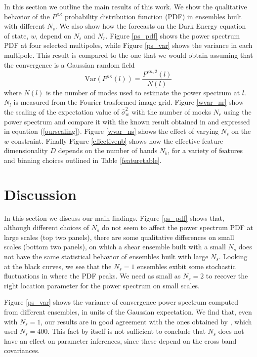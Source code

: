 \documentclass[reprint,aps,prd,superscriptaddress,showkeys,showpacs]{revtex4-1}
\newcommand{\h}[1]{\hat{#1}}
\begin{document}
In this section we outline the main results of this work. We show the qualitative behavior of the $P^{\kappa\kappa}$ probability distribution function (PDF) in ensembles built with different $N_s$. We also show how the forecasts on the Dark Energy equation of state, $w$, depend on $N_s$ and $N_r$. Figure \ref{ps_pdf} shows the power spectrum PDF at four selected multipoles, while Figure \ref{ps_var} shows the variance in each multipole. This result is compared to the one that we would obtain assuming that the convergence is a Gaussian random field
\begin{equation}
\label{gaussianvar}
\mathrm{Var}(P^{\kappa\kappa}(l)) = \frac{P^{\kappa\kappa,2}(l)}{N(l)}
\end{equation}
%
where $N(l)$ is the number of modes used to estimate the power spectrum at $l$. $N_l$ is measured from the Fourier trasformed image grid. Figure \ref{wvar_nr} show the scaling of the expectation value of $\h{\sigma}_w^2$ with the number of mocks $N_r$ using the power spectrum and compare it with the known result obtained in \citep{DodelsonSchneider13} and expressed in equation (\ref{ourscaling}). Figure \ref{wvar_ns} shows the effect of varying $N_s$ on the $w$ constraint. Finally Figure \ref{effectivenb} shows how the effective feature dimensionality $D$ depends on the number of bands $N_b$, for a variety of features and binning choices outlined in Table \ref{featuretable}. 


\section{Discussion}

In this section we discuss our main findings. Figure \ref{ps_pdf} shows that, although different choices of $N_s$ do not seem to affect the power spectrum PDF at large scales (top two panels), there are some qualitative differences on small scales (bottom two panels), on which a shear ensemble built with a small $N_s$ does not have the same statistical behavior of ensembles built with large $N_s$. Looking at the black curves, we see that the $N_s=1$ ensembles exibit some stochastic fluctuations in where the PDF peaks. We need as small as $N_s=2$ to recover the right location parameter for the power spectrum on small scales. 

Figure \ref{ps_var} shows the variance of convergence power spectrum computed from different ensembles, in units of the Gaussian expectation. We find that, even with $N_s=1$, our results are in good agreement with the ones obtained by \citep{Sato12}, which used $N_s=400$. This fact by itself is not sufficient to conclude that $N_s$ does not have an effect on parameter inferences, since these depend on the cross band covariances. 
\end{document}
